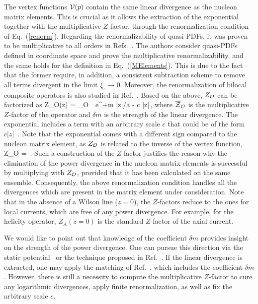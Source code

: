 \medskip
The vertex functions ${\cal V}(p)$ contain the same linear divergence as the nucleon matrix elements.
This is crucial as it allows the extraction of the exponential together with the multiplicative $Z$-factor,
through the renormalization condition of Eq.~(\ref{renorm}). Regarding the renormalizability of quasi-PDFs,
it was proven to be multiplicative to all orders in Refs.~\cite{Ishikawa:2016znu,Ishikawa:2017faj}.
The authors consider quasi-PDFs defined in coordinate space and prove the multiplicative renormalizability,
and the same holds for the definition in Eq.~(\ref{MElements}). This is due to the fact that the former require,
in addition, a consistent subtraction scheme to remove all terms divergent in the limit $\xi_z\rightarrow 0$.
Moreover, the renormalization of bilocal composite operators is also studied in Ref.~\cite{Ishikawa:2016znu,Ishikawa:2017faj}.
Based on the above, $Z_{\cal O}$ can be factorized as
\be
Z_{\cal O}(z) = _{\cal O} \,\, e^{+\delta m |z|/a - c |z|}\,,
\ee
where $\overline{\cal Z}_{\cal O}$ is the multiplicative $Z$-factor of the operator and $\delta m$ is the strength of the linear divergence.
The exponential includes a term with an arbitrary scale $c$ that could be of the form $c|z|$~\cite{Sommer:2015hea}. Note that the exponential comes with a
different sign compared to the nucleon matrix element, as $Z_{\cal O}$ is related to the inverse
of the vertex function,
\be
Z_{\cal O} = \,.
\ee
Such a construction of the $Z$-factor justifies the reason why the elimination of the power divergence in the nucleon matrix elements is successful
by multiplying with $Z_{\cal O}$, provided that it has been calculated on the same ensemble.
Consequently, the above renormalization condition handles all the divergences which are present in the matrix element under
consideration. Note that in the absence of a Wilson line ($z{=}0$), the $Z$-factors reduce to the ones for local currents,
which are free of any power divergence. For example, for the helicity operator, $Z_A(z{=}0)$ is the standard $Z$-factor
of the axial current.

\medskip
We would like to point out that knowledge of the coefficient $\delta m$ provides insight on the strength of the power divergence.
One can pursue this direction via the static potential~\cite{Ishikawa:2016znu} or the technique proposed in Ref.~\cite{Constantinou:2017sej}.
If the linear divergence is extracted, one may apply the matching of Ref.~\cite{Chen:2016fxx}, which includes the coefficient $\delta m$.
However, there is still a necessity to compute the multiplicative $Z$-factor to cure any logarithmic divergences, apply finite
renormalization, as well as fix the arbitrary scale $c$.


